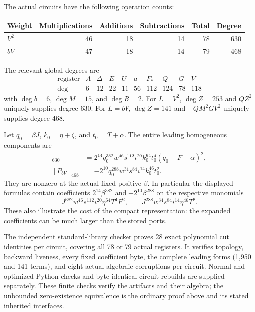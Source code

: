 The actual circuits have the following operation counts:
\begin{center}
\begin{tabular}{lrrrrr}
\toprule
Weight&Multiplications&Additions&Subtractions&Total&Degree\\
\midrule
$V^2$&46&18&14&78&630\\
$bV$&47&18&14&79&468\\
\bottomrule
\end{tabular}
\end{center}
The relevant global degrees are
\[
 \begin{array}{c|rrrrrrrrr}
 \text{register}&A&\Delta&E&U&a&F_*&Q&G&V\\\hline
 \deg&6&12&22&11&56&112&124&78&118
 \end{array}
\]
with $\deg b=6$, $\deg M=15$, and $\deg B=2$.
For $L=V^2$, $\deg Z=253$ and $QZ^2$ uniquely supplies degree 630.
For $L=bV$, $\deg Z=141$ and $-QM^2GV^2$ uniquely supplies degree 468.

Let $q_0=\beta J$, $k_0=\eta+\zeta$, and $t_0=T+\alpha$.
The entire leading homogeneous components are
\begin{align*}
 [P_{V^2}]_{630}
 &=2^{14}q_0^{382}w^{46}s^{112}i^{20}k_0^{64}t_0^4
       (q_0-F-\alpha)^2,\\
 [P_{bV}]_{468}
 &=-2^{10}q_0^{288}w^{34}s^{84}i^{14}k_0^{46}t_0^2.
\end{align*}
They are nonzero at the actual fixed positive $\beta$.
In particular the displayed formulas contain coefficients
$2^{14}\beta^{382}$ and $-2^{10}\beta^{288}$ on the respective
monomials
\[
 J^{382}w^{46}s^{112}i^{20}\eta^{64}T^4F^2,
 \qquad J^{288}w^{34}s^{84}i^{14}\eta^{46}T^2.
\]
These also illustrate the cost of the compact representation: the
expanded coefficients can be much larger than the stored ports.

The independent standard-library checker proves 28 exact polynomial
cut identities per circuit, covering all 78 or 79 actual registers.
It verifies topology, backward liveness, every fixed coefficient byte,
the complete leading forms (1,950 and 141 terms), and eight actual
algebraic corruptions per circuit. Normal and optimized Python checks
and byte-identical circuit rebuilds are supplied separately.
These finite checks verify the artifacts and their algebra; the
unbounded zero-existence equivalence is the ordinary proof above and
its stated inherited interfaces.

